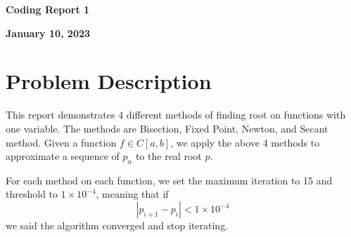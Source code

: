 \documentclass[a4paper,12pt]{article}
\begin{document}
\begin{center} %
	{\Large \bf Coding Report 1} %
	\vspace{2mm}
	
       
	{\bf January 10, 2023}
\end{center}  

\vspace{0.4cm}


\section{Problem Description}
This report demonstrates 4 different methods of finding root on functions with one variable.
The methods are Bisection, Fixed Point, Newton, and Secant method.
Given a function $f \in C[a, b]$, 
we apply the above 4 methods to approximate a sequence of $p_n$ to the real root $p$.

For each method on each function,
we set the maximum iteration to 15 and threshold to $1 \times 10^{-4}$,
meaning that if
$$
|p_{i+1} - p_{i}| < 1 \times 10^{-4}
$$
we said the algorithm converged and stop iterating.
\end{document}
